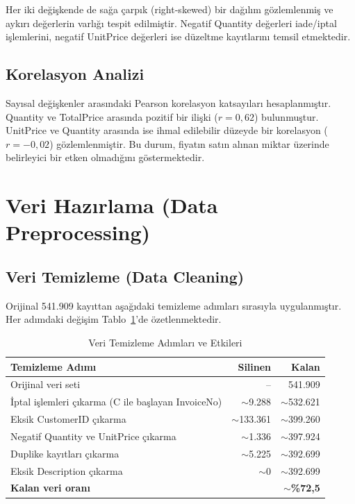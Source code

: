 \documentclass[conference]{IEEEtran}
\begin{document}
Her iki değişkende de sağa çarpık (right-skewed) bir dağılım gözlemlenmiş ve aykırı değerlerin varlığı tespit edilmiştir. Negatif Quantity değerleri iade/iptal işlemlerini, negatif UnitPrice değerleri ise düzeltme kayıtlarını temsil etmektedir.

\subsection{Korelasyon Analizi}

Sayısal değişkenler arasındaki Pearson korelasyon katsayıları hesaplanmıştır. Quantity ve TotalPrice arasında pozitif bir ilişki ($r = 0,62$) bulunmuştur. UnitPrice ve Quantity arasında ise ihmal edilebilir düzeyde bir korelasyon ($r = -0,02$) gözlemlenmiştir. Bu durum, fiyatın satın alınan miktar üzerinde belirleyici bir etken olmadığını göstermektedir.

\section{Veri Hazırlama (Data Preprocessing)}

\subsection{Veri Temizleme (Data Cleaning)}

Orijinal 541.909 kayıttan aşağıdaki temizleme adımları sırasıyla uygulanmıştır. Her adımdaki değişim Tablo~\ref{tab:cleaning}'de özetlenmektedir.

\begin{table}[h]
\centering
\caption{Veri Temizleme Adımları ve Etkileri}
\label{tab:cleaning}
\begin{tabular}{p{3.8cm}rr}
\toprule
\textbf{Temizleme Adımı} & \textbf{Silinen} & \textbf{Kalan} \\
\midrule
Orijinal veri seti & -- & 541.909 \\
İptal işlemleri çıkarma (C ile başlayan InvoiceNo) & $\sim$9.288 & $\sim$532.621 \\
Eksik CustomerID çıkarma & $\sim$133.361 & $\sim$399.260 \\
Negatif Quantity ve UnitPrice çıkarma & $\sim$1.336 & $\sim$397.924 \\
Duplike kayıtları çıkarma & $\sim$5.225 & $\sim$392.699 \\
Eksik Description çıkarma & $\sim$0 & $\sim$392.699 \\
\midrule
\textbf{Kalan veri oranı} & & \textbf{$\sim$\%72,5} \\
\bottomrule
\end{tabular}
\end{table}
\end{document}
